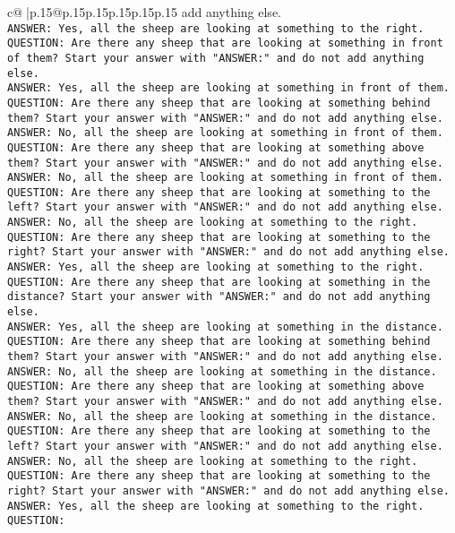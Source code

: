\documentclass{article}
\begin{document}
{\begin{supertabular}{c@{$\;$}|p{.15\linewidth}@{}p{.15\linewidth}p{.15\linewidth}p{.15\linewidth}p{.15\linewidth}p{.15\linewidth}}
{{{add anything else.\\ \tt ANSWER: Yes, all the sheep are looking at something to the right.\\ \tt QUESTION: Are there any sheep that are looking at something in front of them? Start your answer with "ANSWER:" and do not add anything else.\\ \tt ANSWER: Yes, all the sheep are looking at something in front of them.\\ \tt QUESTION: Are there any sheep that are looking at something behind them? Start your answer with "ANSWER:" and do not add anything else.\\ \tt ANSWER: No, all the sheep are looking at something in front of them.\\ \tt QUESTION: Are there any sheep that are looking at something above them? Start your answer with "ANSWER:" and do not add anything else.\\ \tt ANSWER: No, all the sheep are looking at something in front of them.\\ \tt QUESTION: Are there any sheep that are looking at something to the left? Start your answer with "ANSWER:" and do not add anything else.\\ \tt ANSWER: No, all the sheep are looking at something to the right.\\ \tt QUESTION: Are there any sheep that are looking at something to the right? Start your answer with "ANSWER:" and do not add anything else.\\ \tt ANSWER: Yes, all the sheep are looking at something to the right.\\ \tt QUESTION: Are there any sheep that are looking at something in the distance? Start your answer with "ANSWER:" and do not add anything else.\\ \tt ANSWER: Yes, all the sheep are looking at something in the distance.\\ \tt QUESTION: Are there any sheep that are looking at something behind them? Start your answer with "ANSWER:" and do not add anything else.\\ \tt ANSWER: No, all the sheep are looking at something in the distance.\\ \tt QUESTION: Are there any sheep that are looking at something above them? Start your answer with "ANSWER:" and do not add anything else.\\ \tt ANSWER: No, all the sheep are looking at something in the distance.\\ \tt QUESTION: Are there any sheep that are looking at something to the left? Start your answer with "ANSWER:" and do not add anything else.\\ \tt ANSWER: No, all the sheep are looking at something to the right.\\ \tt QUESTION: Are there any sheep that are looking at something to the right? Start your answer with "ANSWER:" and do not add anything else.\\ \tt ANSWER: Yes, all the sheep are looking at something to the right.\\ \tt QUESTION: }}}
\end{supertabular}}
\end{document}
